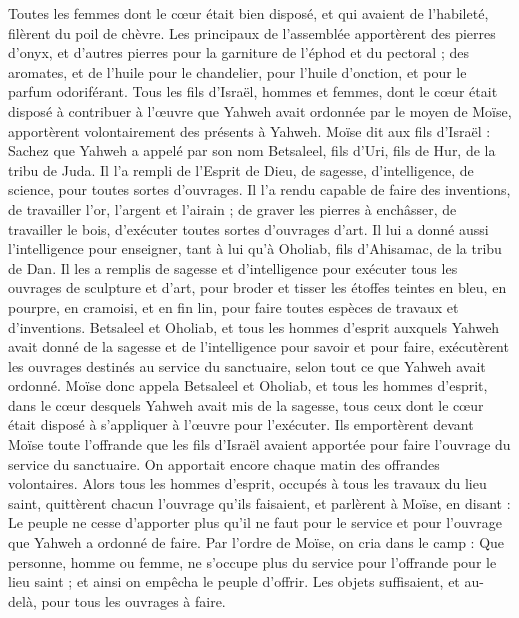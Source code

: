 \begin{multicols}{2}
Toutes les femmes dont le cœur était bien disposé, et qui avaient de l’habileté, filèrent du poil de chèvre.
Les principaux de l'assemblée apportèrent des pierres d'onyx, et d’autres pierres pour la garniture de l'éphod et du pectoral ;
des aromates, et de l'huile pour le chandelier, pour l'huile d'onction, et pour le parfum odoriférant.
Tous les fils d’Israël, hommes et femmes, dont le cœur était disposé à contribuer à l’œuvre que Yahweh avait ordonnée par le moyen de Moïse, apportèrent volontairement des présents à Yahweh.
Moïse dit aux fils d'Israël : Sachez que Yahweh a appelé par son nom Betsaleel, fils d'Uri, fils de Hur, de la tribu de Juda.
Il l'a rempli de l'Esprit de Dieu, de sagesse, d’intelligence, de science, pour toutes sortes d'ouvrages.
Il l’a rendu capable de faire des inventions, de travailler l’or, l’argent et l’airain ;
de graver les pierres à enchâsser, de travailler le bois, d’exécuter toutes sortes d’ouvrages d’art.
Il lui a donné aussi l’intelligence pour enseigner, tant à lui qu'à Oholiab, fils d'Ahisamac, de la tribu de Dan.
Il les a remplis de sagesse et d’intelligence pour exécuter tous les ouvrages de sculpture et d’art, pour broder et tisser les étoffes teintes en bleu, en pourpre, en cramoisi, et en fin lin, pour faire toutes espèces de travaux et d’inventions.
\VerseOne{}Betsaleel et Oholiab, et tous les hommes d'esprit auxquels Yahweh avait donné de la sagesse et de l'intelligence pour savoir et pour faire, exécutèrent les ouvrages destinés au service du sanctuaire, selon tout ce que Yahweh avait ordonné.
Moïse donc appela Betsaleel et Oholiab, et tous les hommes d'esprit, dans le cœur desquels Yahweh avait mis de la sagesse, tous ceux dont le cœur était disposé à s’appliquer à l’œuvre pour l’exécuter.
Ils emportèrent devant Moïse toute l'offrande que les fils d'Israël avaient apportée pour faire l'ouvrage du service du sanctuaire. On apportait encore chaque matin des offrandes volontaires.
Alors tous les hommes d’esprit, occupés à tous les travaux du lieu saint, quittèrent chacun l’ouvrage qu’ils faisaient,
et parlèrent à Moïse, en disant : Le peuple ne cesse d'apporter plus qu'il ne faut pour le service et pour l'ouvrage que Yahweh a ordonné de faire.
Par l’ordre de Moïse, on cria dans le camp : Que personne, homme ou femme, ne s’occupe plus du service pour l'offrande pour le lieu saint ; et ainsi on empêcha le peuple d'offrir.
Les objets suffisaient, et au-delà, pour tous les ouvrages à faire.

\end{multicols}
